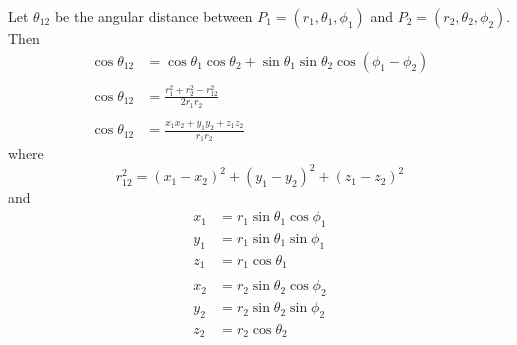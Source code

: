 \documentclass[12pt]{article}
\begin{document}
\noindent
Let $\theta_{12}$ be the angular distance between
$P_1=(r_1,\theta_1,\phi_1)$ and
$P_2=(r_2,\theta_2,\phi_2)$.
Then
\begin{align*}
\cos\theta_{12}
&=\cos\theta_1\cos\theta_2+\sin\theta_1\sin\theta_2\cos(\phi_1-\phi_2)
\\
\\
\cos\theta_{12}
&=\frac{r_1^2+r_2^2-r_{12}^2}{2r_1r_2}
\\
\\
\cos\theta_{12}
&=\frac{x_1x_2+y_1y_2+z_1z_2}{r_1r_2}
\end{align*}
where
\begin{equation*}
r_{12}^2=(x_1-x_2)^2+(y_1-y_2)^2+(z_1-z_2)^2
\end{equation*}
and
\begin{align*}
x_1&=r_1\sin\theta_1\cos\phi_1
\\
y_1&=r_1\sin\theta_1\sin\phi_1
\\
z_1&=r_1\cos\theta_1
\\
\\
x_2&=r_2\sin\theta_2\cos\phi_2
\\
y_2&=r_2\sin\theta_2\sin\phi_2
\\
z_2&=r_2\cos\theta_2
\end{align*}
\end{document}
